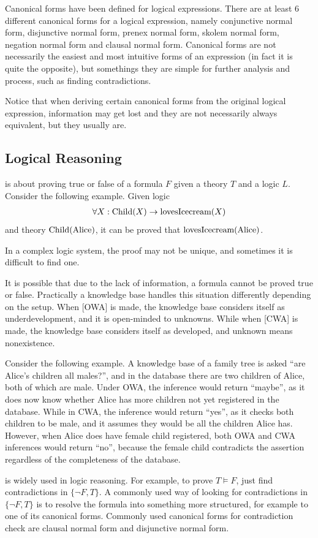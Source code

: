 Canonical forms have been defined for logical expressions. There are at least 6 different canonical forms for a logical expression, namely conjunctive normal form, disjunctive normal form, prenex normal form, skolem normal form, negation normal form and clausal normal form. Canonical forms are not necessarily the easiest and most intuitive forms of an expression (in fact it is quite the opposite), but somethings they are simple for further analysis and process, such as finding contradictions.

Notice that when deriving certain canonical forms from the original logical expression, information may get lost and they are not necessarily always equivalent, but they usually are.

\subsection{Logical Reasoning}

 is about proving true or false of a formula $F$ given a theory $T$ and a logic $L$. Consider the following example. Given logic
\begin{eqnarray}
\forall X: \textup{Child}(X) \rightarrow \textup{lovesIcecream}(X) \nonumber
\end{eqnarray}
and theory $\textup{Child}(\textup{Alice})$, it can be proved that $\textup{lovesIcecream}(\textup{Alice})$. 

In a complex logic system, the proof may not be unique, and sometimes it is difficult to find one. 

It is possible that due to the lack of information, a formula cannot be proved true or false. Practically a knowledge base handles this situation differently depending on the setup. When [OWA] is made, the knowledge base considers itself as underdevelopment, and it is open-minded to unknowns. While when [CWA] is made, the knowledge base considers itself as developed, and unknown means nonexistence. 

Consider the following example. A knowledge base of a family tree is asked ``are Alice's children all males?'', and in the database there are two children of Alice, both of which are male. Under OWA, the inference would return ``maybe'', as it does now know whether Alice has more children not yet registered in the database. While in CWA, the inference would return ``yes'', as it checks both children to be male, and it assumes they would be all the children Alice has. However, when Alice does have female child registered, both OWA and CWA inferences would return ``no'', because the female child contradicts the assertion regardless of the completeness of the database.

 is widely used in logic reasoning. For example, to prove $T\models F$, just find contradictions in $\{\neg F, T\}$. A commonly used way of looking for contradictions in $\{\neg F, T\}$ is to resolve the formula into something more structured, for example to one of its canonical forms. Commonly used canonical forms for contradiction check are clausal normal form and disjunctive normal form.

